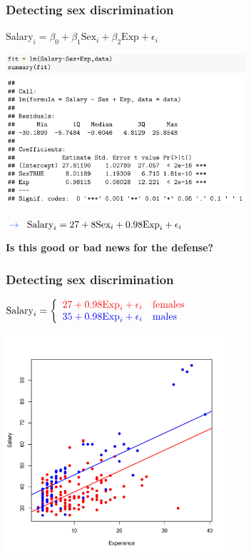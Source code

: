 \documentclass{beamer}
\newcommand{\lb}[1]{\textcolor{lightblue}{#1}}
\newcommand{\sko}{\vspace{.1in}}
\begin{document}
\begin{frame}
\frametitle{Detecting sex discrimination}

\sko
$\text{Salary}_i = \beta_0 + \beta_1\text{Sex}_i + \beta_2 \text{Exp} + \epsilon_i$

\sko
\hspace*{10mm}\includegraphics[width=3.5in]{figures/sexMLR3}

\sko
$
\lb{\rightarrow} \hspace{3mm} \text{Salary}_i = 27 + 8 \text{Sex}_i  +0.98 \text{Exp}_i + \epsilon_i
$


\vspace{1mm}
{\color{burntorange} \bf Is this good or bad news for the defense?}
\end{frame}


\begin{frame}
\frametitle{Detecting sex discrimination}

\sko
$\text{Salary}_i = \left\{ \begin{array}{l}
{\color{red}27 + 0.98 \text{Exp}_i + \epsilon_i \quad \mbox{females}} \\
{\color{blue}35 + 0.98 \text{Exp}_i + \epsilon_i  \quad \mbox{males}}
 \end{array}
 \right.$


\vspace{-7mm}
\hspace*{10mm}\includegraphics[width=3.2in]{figures/SalaryExp.pdf}

\end{frame}
\end{document}
